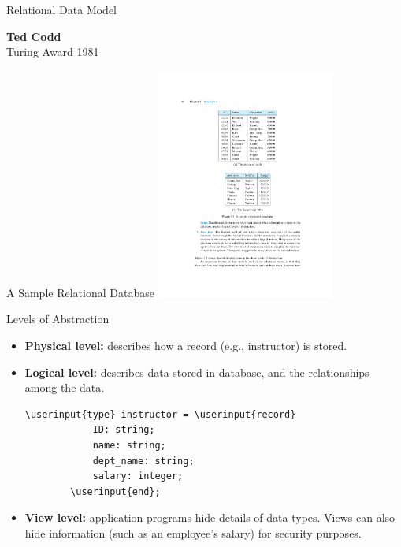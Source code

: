 \documentclass{beamer}
\newcommand\userinput[1]{\textbf{#1}}
\begin{document}
\begin{frame}{Relational Data Model}
\begin{minipage}{0.5\textwidth}
        \textbf{Ted Codd}\\
        Turing Award 1981
    \end{minipage}
\end{frame}

\begin{frame}{A Sample Relational Database}
    \centering 
    \includegraphics[width=0.44\textwidth, trim={7.25cm 10.5cm 6.75cm 4cm}, clip]{figures/db}
\end{frame}

\begin{frame}[fragile]{Levels of Abstraction}
    \begin{itemize}
        \item \textbf{Physical level:} describes how a record (e.g., instructor) is stored.
        \item \textbf{Logical level:} describes data stored in database, and the relationships among the data.
        \begin{Verbatim}[commandchars=\\\{\}]
        \userinput{type} instructor = \userinput{record} 
            ID: string;
            name: string;
            dept_name: string;
            salary: integer;
        \userinput{end};
        \end{Verbatim}
        \item \textbf{View level:} application programs hide details of data types.  Views can also hide information (such as an employee’s salary) for security purposes. 
    \end{itemize}
\end{frame}
\end{document}

